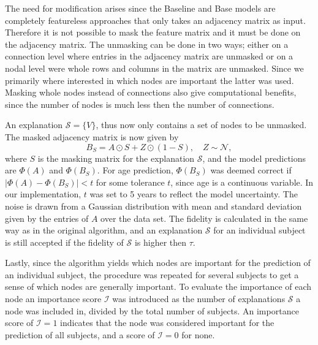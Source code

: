 The need for modification arises since the Baseline and Base models are completely featureless approaches that only takes an adjacency matrix as input. Therefore it is not possible to mask the feature matrix and it must be done on the adjacency matrix. The unmasking can be done in two ways; either on a connection level where entries in the adjacency matrix are unmasked or on a nodal level were whole rows and columns in the matrix are unmasked. Since we primarily where interested in which nodes are important the latter was used. Masking whole nodes instead of connections also give computational benefits, since the number of nodes is much less then the number of connections. 

An explanation $\mathcal{S} = \{V\}$, thus now only contains a set of nodes to be unmasked. The masked adjacency matrix is now given by 
\begin{equation*}
    B_S = A \odot S + Z \odot (1- S), \quad Z \sim \mathcal{N},
\end{equation*}
where $S$ is the masking matrix for the explanation $\mathcal{S}$, and the model predictions are $\Phi(A)$ and $\Phi(B_S)$. For age prediction, $\Phi(B_S)$ was deemed correct if $\left|\Phi(A) - \Phi(B_S)\right| < t$ for some tolerance $t$, since age is a continuous variable. In our implementation, $t$ was set to 5 years to reflect the model uncertainty. The noise is drawn from a Gaussian distribution with mean and standard deviation given by the entries of $A$ over the data set. The fidelity is calculated in the same way as in the original algorithm, and an explanation $\mathcal{S}$ for an individual subject is still accepted if the fidelity of $\mathcal{S}$ is higher then $\tau$. 

Lastly, since the algorithm yields which nodes are important for the prediction of an individual subject, the procedure was repeated for several subjects to get a sense of which nodes are generally important. To evaluate the importance of each node an importance score $\mathcal{I}$ was introduced as the number of explanations $\mathcal{S}$ a node was included in, divided by the total number of subjects. An importance score of $\mathcal{I}=1$ indicates that the node was considered important for the prediction of all subjects, and a score of $\mathcal{I}=0$ for none.  



